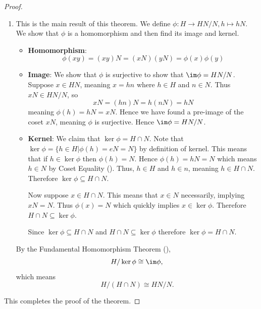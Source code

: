 \begin{proof}
\begin{enumerate}
        \item This is the main result of this theorem. We define $\phi: H \to HN/N, h \mapsto hN$. We show that $\phi$ is a homomorphism and then find its image and kernel.
        \begin{itemize}
            \item \textbf{Homomorphism}:
            \[
                \phi(xy) = (xy)N = (xN)(yN) = \phi(x)\phi(y)    
            \]

            \item \textbf{Image}: We show that $\phi$ is surjective to show that $\im\phi = HN/N$. Suppose $x \in HN$, meaning $x = hn$ where $h \in H$ and $n \in N$. Thus $xN \in HN/N$, so
            \[
                xN = (hn)N = h(nN) = hN
            \]
            meaning $\phi(h) = hN = xN$. Hence we have found a pre-image of the coset $xN$, meaning $\phi$ is surjective. Hence $\im \phi = HN/N$.

            \item \textbf{Kernel}: We claim that $\ker\phi = H \cap N$. Note that $\ker\phi = \{h \in H \vert \phi(h) = eN = N\}$ by definition of kernel. This means that if $h \in \ker\phi$ then $\phi(h) = N$. Hence $\phi(h) = hN = N$ which means $h \in N$ by Coset Equality (). Thus, $h \in H$ and $h \in n$, meaning $h \in H \cap N$. Therefore $\ker \phi \subseteq H \cap N$.
    
            Now suppose $x \in H \cap N$. This means that $x \in N$ necessarily, implying $xN = N$. Thus $\phi(x) = N$ which quickly implies $x \in \ker\phi$. Therefore $H \cap N \subseteq \ker\phi$.
    
            Since $\ker \phi \subseteq H \cap N$ and  $H \cap N \subseteq \ker\phi$ therefore $\ker\phi = H\cap N$.
        \end{itemize}

        By the Fundamental Homomorphism Theorem (),
        \[
            H / \ker\phi \cong \im \phi,
        \]
        which means
        \[
            H/(H\cap N) \cong HN/N.
        \]
    \end{enumerate}
    This completes the proof of the theorem.
\end{proof}

